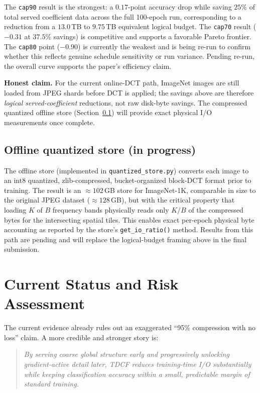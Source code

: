 \documentclass[10pt,twocolumn]{article}
\begin{document}
The \texttt{cap90} result is the strongest: a $0.17$-point accuracy drop while saving $25\%$ of total served coefficient data across the full 100-epoch run, corresponding to a reduction from a $13.0$\,TB to $9.75$\,TB equivalent logical budget. The \texttt{cap70} result ($-0.31$ at $37.5\%$ savings) is competitive and supports a favorable Pareto frontier. The \texttt{cap80} point ($-0.90$) is currently the weakest and is being re-run to confirm whether this reflects genuine schedule sensitivity or run variance. Pending re-run, the overall curve supports the paper's efficiency claim.

\textbf{Honest claim.} For the current online-DCT path, ImageNet images are still loaded from JPEG shards before DCT is applied; the savings above are therefore \emph{logical served-coefficient} reductions, not raw disk-byte savings. The compressed quantized offline store (Section~\ref{sec:offline}) will provide exact physical I/O measurements once complete.

\subsection{Offline quantized store (in progress)}
\label{sec:offline}

The offline store (implemented in \texttt{quantized\_store.py}) converts each image to an int8 quantized, zlib-compressed, bucket-organized block-DCT format prior to training. The result is an $\approx 102$\,GB store for ImageNet-1K, comparable in size to the original JPEG dataset ($\approx 128$\,GB), but with the critical property that loading $K$ of $B$ frequency bands physically reads only $K/B$ of the compressed bytes for the intersecting spatial tiles. This enables exact per-epoch physical byte accounting as reported by the store's \texttt{get\_io\_ratio()} method. Results from this path are pending and will replace the logical-budget framing above in the final submission.

\section{Current Status and Risk Assessment}
The current evidence already rules out an exaggerated ``95\% compression with no loss'' claim. A more credible and stronger story is:
\begin{quote}
\emph{By serving coarse global structure early and progressively unlocking gradient-active detail later, TDCF reduces training-time I/O substantially while keeping classification accuracy within a small, predictable margin of standard training.}
\end{quote}
\end{document}
